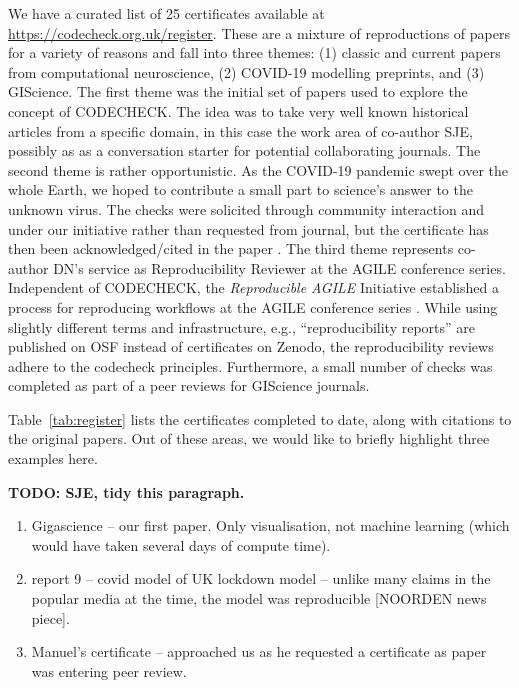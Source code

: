 \documentclass[12pt]{article}
\begin{document}
We have a curated list of 25 certificates available at
\url{https://codecheck.org.uk/register}. These are a mixture of
reproductions of papers for a variety of reasons and fall into three themes:
(1) classic and current papers from computational neuroscience,
(2) COVID-19 modelling preprints, and
(3) GIScience.  
The first theme was the initial set of papers used to explore the concept
of CODECHECK. The idea was to take very well known historical articles from a 
specific domain, in this case the work area of co-author SJE, possibly 
as as a conversation starter for potential collaborating journals.
The second theme is rather opportunistic. As the COVID-19 pandemic swept
over the whole Earth, we hoped to contribute a small part to science's answer
to the unknown virus. The checks were solicited through community interaction
and under our initiative rather than requested from journal, but the certificate
has then been acknowledged/cited in the paper \cite{Davies2020-vj}.
The third theme represents co-author DN's service as Reproducibility
Reviewer at the AGILE conference series.
Independent of CODECHECK, the \emph{Reproducible AGILE} Initiative \cite{reproducible_agile}
established a process for reproducing workflows at the AGILE conference
series \cite{nust_improving_2020}.
While using slightly different terms and infrastructure, e.g., ``reproducibility
reports'' are published on OSF instead of certificates on Zenodo, the 
reproducibility reviews adhere to the codecheck principles.
Furthermore, a small number of checks was completed as part of a peer reviews
for GIScience journals.

Table~\ref{tab:register} lists the certificates completed to date,
along with citations to the original papers.
Out of these areas, we would like to briefly highlight three examples here.

\textbf{TODO: SJE, tidy this paragraph.}
\begin{enumerate}
\def\labelenumi{\arabic{enumi}.}
\item
  Gigascience -- our first paper.  Only visualisation, not machine
  learning (which would have taken several days of compute time).
\item
  report 9 -- covid model of UK lockdown model -- unlike many claims
  in the popular media at the time, the model was reproducible
  [NOORDEN news piece]. 
\item
  Manuel's certificate -- approached us as he requested a certificate
  as paper was entering peer review.
\end{enumerate}
\end{document}
